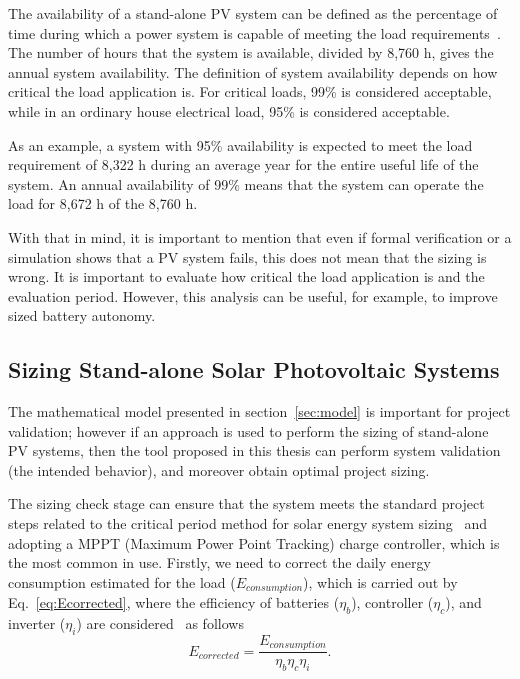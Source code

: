 The availability of a stand-alone PV system can be defined as the percentage of time during which a power system is capable of meeting the load requirements~\cite{Khatib2014}. The number of hours that the system is available, divided by 8,760 h, gives the annual system availability.
The definition of system availability depends on how critical the load application is. For critical loads, 99\% is considered acceptable, while in an ordinary house electrical load, 95\% is considered acceptable. 

As an example, a system with 95\% availability is expected to meet the load requirement of 8,322 h during an average year for the entire useful life of the system. An annual availability of 99\% means that the system can operate the load for 8,672 h of the 8,760 h.

With that in mind, it is important to mention that even if formal verification or a simulation shows that a PV system fails, this  does not mean that the sizing is wrong. It is important to evaluate how critical the load application is and the evaluation period. However, this analysis can be useful, for example, to improve sized battery autonomy.

\subsection{Sizing Stand-alone Solar Photovoltaic Systems}
\label{sec:sizing}

The mathematical model presented in section~\ref{sec:model} is important for project validation; however if an approach is used to perform the sizing of stand-alone PV systems, then the tool proposed in this thesis can perform system validation (the intended behavior), and moreover obtain optimal project sizing.

The sizing check stage can ensure that the system meets the standard project steps related 
to the critical period method for solar energy system sizing~\cite{Pinho} and adopting a MPPT (Maximum Power Point Tracking) charge controller,
which is the most common in use. Firstly, we need to correct the daily energy consumption estimated for the load 
($E_{consumption}$), which is carried out by Eq.~\eqref{eq:Ecorrected}, where the efficiency of batteries ($\eta_{b}$), 
controller ($\eta_{c}$), and inverter ($\eta_{i}$) are considered~\cite{Pinho} as follows
%
\begin{equation}
\label{eq:Ecorrected}
E_{corrected} = \dfrac{E_{consumption}}{\eta_{b} \eta_{c} \eta_{i} }.
\end{equation}


